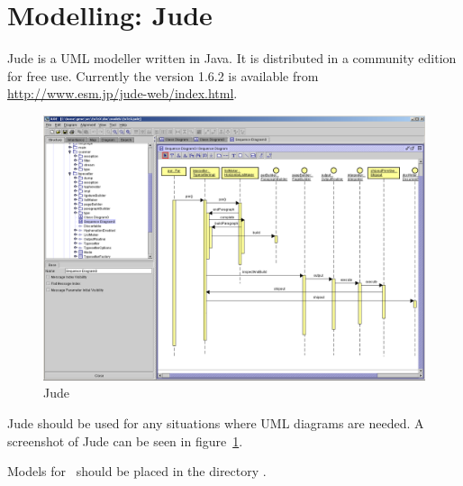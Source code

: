 \section{Modelling: Jude}

Jude is a UML modeller written in Java. It is distributed in a
community edition for free use. Currently the version 1.6.2 is
available from \url{http://www.esm.jp/jude-web/index.html}. 
\begin{figure}[thp]
  \centering
  \includegraphics[width=\textwidth]{image/jude-seq}
  \caption{Jude}\label{fig:jude}
\end{figure}

Jude should be used for any situations where UML diagrams are needed.
A screenshot of Jude can be seen in figure~\ref{fig:jude}.

Models for \ExTeX\ should be placed in the directory .

